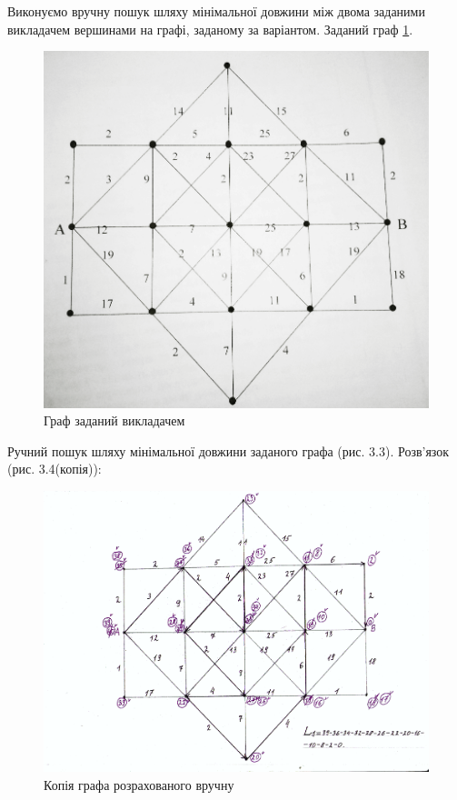 Виконуємо вручну пошук шляху мінімальної довжини між двома заданими викладачем вершинами на графі,
заданому за варіантом. Заданий граф \ref{f:source_graph}.
\begin{figure}[!ht]
  \centering
  \includegraphics[width=.75\textwidth]{images/lab3/image3.png}
  \caption{Граф заданий викладачем}
  \label{f:source_graph}
\end{figure}

Ручний пошук шляху мінімальної довжини заданого графа (рис. 3.3).  Розв'язок (рис. 3.4(копія)):
\begin{figure}[!ht]
  \centering
  \includegraphics[width=.75\textwidth]{images/lab3/image4.png}
  \caption{Копія графа розрахованого вручну}
  \label{f:source_graph_copy}
\end{figure}


